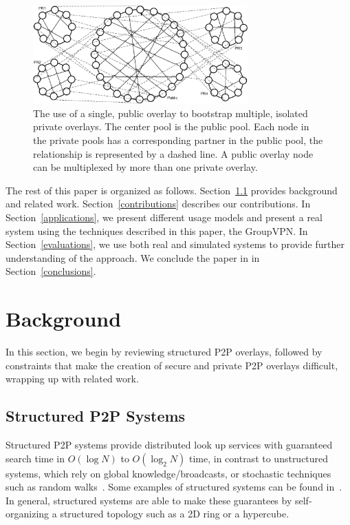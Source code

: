 \documentclass[conference]{IEEEtran}
\begin{document}
\begin{figure}[h]
\centering
\includegraphics[width=3.25in]{subrings.eps}
\caption{The use of a single, public overlay to bootstrap multiple, isolated
private overlays.  The center pool is the public pool.  Each node in the
private pools has a corresponding partner in the public pool, the relationship
is represented by a dashed line.  A public overlay node can be multiplexed by
more than one private overlay.}
\label{fig:subrings}
\end{figure}

The rest of this paper is organized as follows.  Section~\ref{structured_p2p}
provides background and related work.
Section~\ref{contributions} describes our contributions.  In
Section~\ref{applications}, we present different usage models and present a
real system using the techniques described in this paper, the GroupVPN.  In
Section~\ref{evaluations}, we use both real and simulated systems to provide
further understanding of the approach.  We conclude the paper in in
Section~\ref{conclusions}.

\section{Background}
\label{background}
In this section, we begin by reviewing structured P2P overlays, followed by
constraints that make the creation of secure and private P2P overlays
difficult, wrapping up with related work.

\subsection{Structured P2P Systems}
\label{structured_p2p}
Structured P2P systems provide distributed look up services with guaranteed
search time in $O(\log N)$ to $O(\log_2 N)$ time, in contrast to unstructured
systems, which rely on global knowledge/broadcasts, or stochastic techniques
such as random walks~\cite{unstructured_v_structured}.  Some examples of
structured systems can be found in~\cite{pastry, chord, symphony, kademlia,
can}.  In general, structured systems are able to make these guarantees by
self-organizing a structured topology such as a 2D ring or a hypercube.
\end{document}
